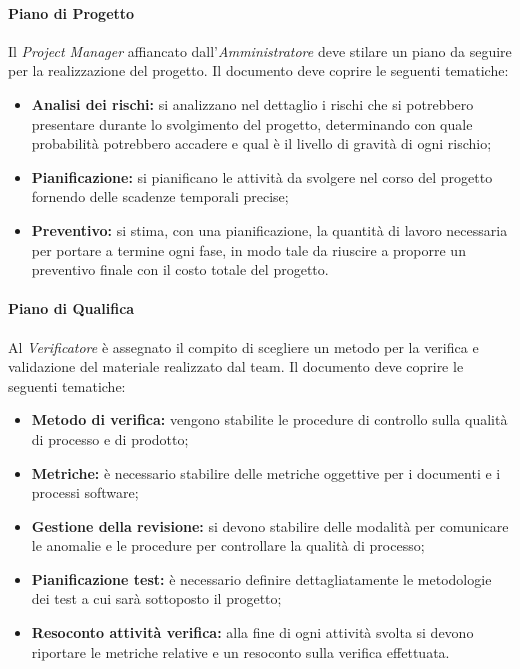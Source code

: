 		\paragraph{Piano di Progetto} \Spazio
		Il \emph{Project Manager} affiancato dall'\emph{Amministratore} deve stilare un piano da seguire per la realizzazione del progetto.
		Il documento deve coprire le seguenti tematiche:
		\begin{itemize}
		\item \textbf{Analisi dei rischi:} si analizzano nel dettaglio i rischi che si potrebbero presentare durante lo svolgimento del progetto, determinando con quale probabilità potrebbero accadere e qual è il livello di gravità di ogni rischio;
		\item \textbf{Pianificazione:} si pianificano le attività da svolgere nel corso del progetto fornendo delle scadenze temporali precise;
		\item \textbf{Preventivo:} si stima, con una pianificazione, la quantità di lavoro necessaria per portare a termine ogni fase, in modo tale da riuscire a proporre un preventivo finale con il costo totale del progetto.
		\end{itemize}
		
		\paragraph{Piano di Qualifica} \Spazio
		Al \emph{Verificatore} è assegnato il compito di scegliere un metodo per la verifica e validazione del materiale realizzato dal team.
		Il documento deve coprire le seguenti tematiche:
		\begin{itemize}
		\item \textbf{Metodo di verifica:} vengono stabilite le procedure di controllo sulla qualità di processo e di prodotto;
		\item \textbf{Metriche:} è necessario stabilire delle metriche oggettive per i documenti e i processi software;
		\item \textbf{Gestione della revisione:} si devono stabilire delle modalità per comunicare le anomalie e le procedure per controllare la qualità di processo;
		\item \textbf{Pianificazione test:} è necessario definire dettagliatamente le metodologie dei test a cui sarà sottoposto il progetto;
		\item \textbf{Resoconto attività verifica:} alla fine di ogni attività svolta si devono riportare le metriche relative e un resoconto sulla verifica effettuata.
		\end{itemize}
	
